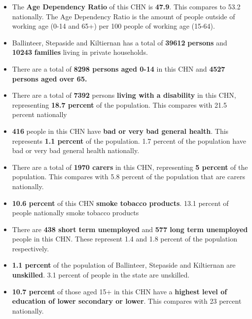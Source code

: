\documentclass{article}
\begin{document}
\begin{itemize}

\item The \textbf{Age Dependency Ratio} of this CHN is  \textbf{47.9}. This compares to 53.2 nationally. The Age Dependency Ratio is the amount of people outside of working age (0-14 and 65+) per 100 people of working age (15-64). 

\item Ballinteer, Stepaside and Kiltiernan has a total of \textbf{\num{39612}} \textbf{persons} and  \textbf{\num{10243}} \textbf{families} living in private households.

\item There are a total of \textbf{\num{8298} persons aged 0-14} in this CHN and \textbf{\num{4527} persons aged over 65.} 

\item There are a total of \textbf{\num{7392}} persons \textbf{living with a disability} in this CHN, representing \textbf{18.7 percent} of the population. This compares with  21.5 percent nationally

\item \textbf{\num{416}} people in this CHN have \textbf{bad or very bad general health}. This represents \textbf{1.1 percent} of the population. 1.7 percent of the population have bad or very bad general health nationally. 

\item There are a total of \textbf{\num{1970} carers} in this CHN, representing \textbf{5 percent} of the population. This compares with 5.8 percent of the population that are carers nationally. 

\item \textbf{10.6 percent} of this CHN \textbf{smoke tobacco products}. 13.1 percent of people nationally smoke tobacco products

\item There are \textbf{\num{438} short term unemployed} and \textbf{\num{577} long term unemployed} people in this CHN. These represent 1.4 and 1.8 percent of the population respectively.

\item  \textbf{1.1 percent} of the population of Ballinteer, Stepaside and Kiltiernan are \textbf{unskilled}. 3.1 percent of people in the state are unskilled.

\item \textbf{10.7 percent} of those aged 15+ in this CHN have a \textbf{highest level of education of lower secondary or lower}. This compares with 23 percent nationally. 


\end{itemize}
\end{document}

